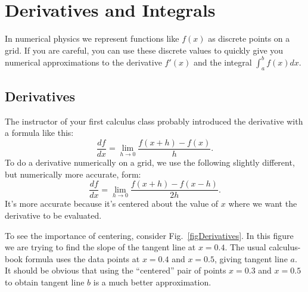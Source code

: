 \chapter{Derivatives and Integrals}

\label{chap:Calculus}

In numerical physics we represent functions like $f(x)$ as discrete points on
a grid.  If you are careful, you can use these discrete values to quickly
give you numerical approximations to the derivative $f'(x)$ and the integral
$\int_a^b f(x) dx$.

\medskip

\section{Derivatives}

The instructor of your first calculus class probably introduced the
derivative with a formula like this:
\begin{equation}
    \frac{df}{dx} =
    \lim_{ h \rightarrow 0} \frac{f(x+h)-f(x) }{ h} .
\end{equation}
To do a derivative numerically on a grid, we use the following slightly
different, but numerically more accurate, form:
\begin{equation}
\frac{df }{ dx} = \lim_{ h \rightarrow 0} \frac{f(x+h)-f(x-h) }{ 2 h} .
\end{equation}
It's more accurate because it's centered about the value of $x$ where we want
the derivative to be evaluated.


To see the importance of centering, consider Fig.~\ref{figDerivatives}. In
this figure we are trying to find the slope of the tangent line at $x=0.4$.
The usual calculus-book formula uses the data points at $x=0.4$ and $x=0.5$,
giving tangent line $a$. It should be obvious that using the ``centered''
pair of points $x=0.3$ and $x=0.5$ to obtain tangent line $b$ is a much
better approximation.

